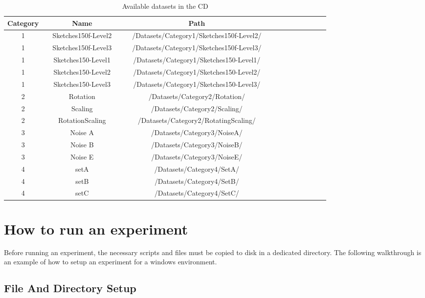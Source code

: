 \begin{table}[H]
\centering
\caption[List of all datasets available in the CD]{Available datasets in the CD}
\begin{tabular}{ccccccccccccccc}
  \hline
      Category & & Name & & & Path \\
  \hline
      1 & & Sketches150f-Level2 & & & /Datasets/Category1/Sketches150f-Level2/ \\
      1 & & Sketches150f-Level3 & & & /Datasets/Category1/Sketches150f-Level3/  \\
      1 & & Sketches150-Level1 & & & /Datasets/Category1/Sketches150-Level1/  \\
      1 & & Sketches150-Level2 & & & /Datasets/Category1/Sketches150-Level2/  \\
      1 & & Sketches150-Level3 & & & /Datasets/Category1/Sketches150-Level3/  \\
      2 & & Rotation & & & /Datasets/Category2/Rotation/  \\
      2 & & Scaling & & & /Datasets/Category2/Scaling/  \\
      2 & & RotationScaling & & & /Datasets/Category2/RotatingScaling/  \\
      3 & & Noise A & & & /Datasets/Category3/NoiseA/  \\
      3 & & Noise B & & & /Datasets/Category3/NoiseB/  \\
      3 & & Noise E & & & /Datasets/Category3/NoiseE/  \\
      4 & & setA & & & /Datasets/Category4/SetA/  \\
      4 & & setB & & & /Datasets/Category4/SetB/  \\
      4 & & setC & & & /Datasets/Category4/SetC/  \\
  \hline
\end{tabular}
\end{table}
\vspace{65.3mm}


\section{How to run an experiment}
\label{sec:howto}
Before running an experiment, the necessary scripts and files must be copied to disk in a dedicated directory. The following walkthrough is an example of how to setup an experiment for a windows environment.

\subsection{File And Directory Setup}


